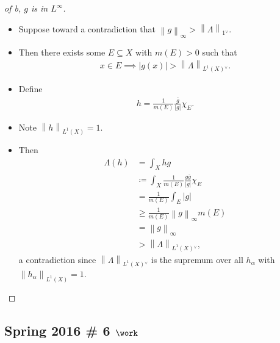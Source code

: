 \begin{solution}
\begin{proof}[of b, $g$ is in $L^\infty$]
\begin{itemize}
\begin{itemize}
    \begin{itemize}
    \item
      Suppose toward a contradiction that
      \({\left\lVert {g} \right\rVert}_\infty > {\left\lVert {\Lambda} \right\rVert}_{1 {}^{ \vee }}\).
    \item
      Then there exists some \(E\subseteq X\) with \(m(E) > 0\) such
      that
      \begin{align*}x\in E \implies {\left\lvert {g(x)} \right\rvert} > {\left\lVert {\Lambda} \right\rVert}_{L^1(X) {}^{ \vee }}.\end{align*}
    \item
      Define
      \begin{align*}
      h = \frac{1}{m(E)} \frac{\overline{g}}{{\left\lvert {g} \right\rvert}} \chi_E
      .\end{align*}
    \item
      Note \({\left\lVert {h} \right\rVert}_{L^1(X)} = 1\).
    \item
      Then
      \begin{align*}
      \Lambda(h) &= \int_X hg \\
      &\coloneqq\int_X \frac{1}{m(E)} \frac{g \overline g}{{\left\lvert {g} \right\rvert}} \chi_E \\
      &= \frac{1}{m(E)} \int_E {\left\lvert {g} \right\rvert} \\
      &\geq \frac{1}{m(E)} {\left\lVert {g} \right\rVert}_\infty m(E) \\
      &= {\left\lVert {g} \right\rVert}_\infty \\
      &> {\left\lVert {\Lambda} \right\rVert}_{L^1(X) {}^{ \vee }}
      ,\end{align*}
      a contradiction since
      \({\left\lVert {\Lambda} \right\rVert}_{L^1(X) {}^{ \vee }}\) is
      the supremum over all \(h_\alpha\) with
      \({\left\lVert {h_\alpha} \right\rVert}_{L^1(X)} = 1\).
    \end{itemize}
  \end{itemize}
\end{itemize}

\end{proof}

\end{solution}

\hypertarget{spring-2016-6-work}{%
\subsection{\texorpdfstring{Spring 2016 \# 6
\(\work\)}{Spring 2016 \# 6 \textbackslash work}}\label{spring-2016-6-work}}

